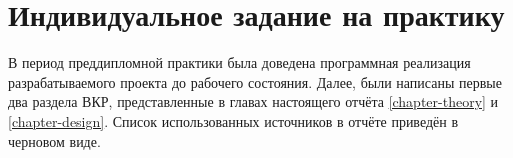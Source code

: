 \chapter{Индивидуальное задание на практику}

В период преддипломной практики была доведена программная реализация разрабатываемого проекта до рабочего состояния.
Далее, были написаны первые два раздела  ВКР, представленные в главах настоящего отчёта \ref{chapter-theory} и \ref{chapter-design}.
Список использованных источников в отчёте приведён в черновом виде.
